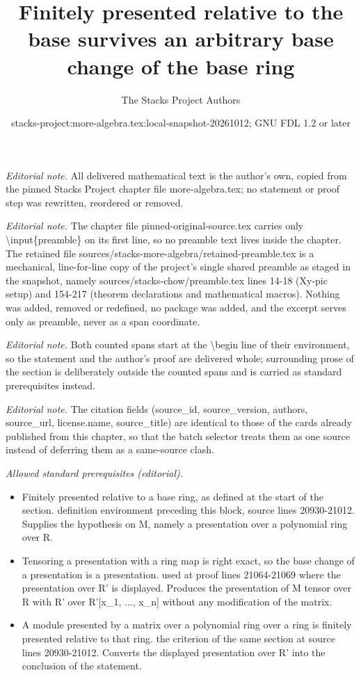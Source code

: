 \documentclass[10pt,a4paper]{amsart}
\title{Finitely presented relative to the base survives an arbitrary base change of the base ring}
\author{The Stacks Project Authors}
\date{stacks-project:more-algebra.tex:local-snapshot-20261012; GNU FDL 1.2 or later}
\theoremstyle{plain}
\theoremstyle{definition}
\theoremstyle{remark}
\numberwithin{equation}{subsection}
\begin{document}
\maketitle
\setcounter{subsection}{1}
\noindent\textit{Editorial note.} All delivered mathematical text is the author's own, copied from the pinned Stacks Project chapter file more-algebra.tex; no statement or proof step was rewritten, reordered or removed.\par\medskip
\noindent\textit{Editorial note.} The chapter file pinned-original-source.tex carries only \textbackslash{}input\{preamble\} on its first line, so no preamble text lives inside the chapter. The retained file sources/stacks-more-algebra/retained-preamble.tex is a mechanical, line-for-line copy of the project's single shared preamble as staged in the snapshot, namely sources/stacks-chow/preamble.tex lines 14-18 (Xy-pic setup) and 154-217 (theorem declarations and mathematical macros). Nothing was added, removed or redefined, no package was added, and the excerpt serves only as preamble, never as a span coordinate.\par\medskip
\noindent\textit{Editorial note.} Both counted spans start at the \textbackslash{}begin line of their environment, so the statement and the author's proof are delivered whole; surrounding prose of the section is deliberately outside the counted spans and is carried as standard prerequisites instead.\par\medskip
\noindent\textit{Editorial note.} The citation fields (source\_id, source\_version, authors, source\_url, license.name, source\_title) are identical to those of the cards already published from this chapter, so that the batch selector treats them as one source instead of deferring them as a same-source clash.\par\medskip
\noindent\textit{Allowed standard prerequisites (editorial).}\begin{itemize}
\item Finitely presented relative to a base ring, as defined at the start of the section. definition environment preceding this block, source lines 20930-21012. Supplies the hypothesis on M, namely a presentation over a polynomial ring over R.
\item Tensoring a presentation with a ring map is right exact, so the base change of a presentation is a presentation. used at proof lines 21064-21069 where the presentation over R' is displayed. Produces the presentation of M tensor over R with R' over R'[x\_1, ..., x\_n] without any modification of the matrix.
\item A module presented by a matrix over a polynomial ring over a ring is finitely presented relative to that ring. the criterion of the same section at source lines 20930-21012. Converts the displayed presentation over R' into the conclusion of the statement.
\end{itemize}\medskip
\end{document}
